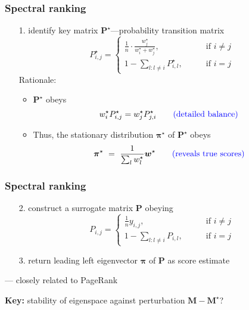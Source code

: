 \documentclass[compress,
mathserif,wide,%
]{beamer}
\begin{document}
\begin{frame}
	\frametitle{Spectral ranking}



	\begin{itemize}
		\item[{\color{black}1.}] identify key matrix  ${\bm{P}}^{\star}$---\alert{probability transition matrix}
		\[
			{P}^{\star}_{i,j}=\begin{cases}
			\frac{1}{n}\cdot\frac{w_j^{\star}}{w_i^{\star}+w_j^{\star}}, & \text{if }i\neq j\\
			1-\sum\nolimits _{l:l\neq i} {P}^{\star}_{i,l},\qquad & \text{if }i=j
			\end{cases}
		\]
		Rationale:
		\begin{itemize}
		\item  $\bm{P}^{\star}$ obeys
		\[
			w_i^{\star} P_{i,j}^{\star} = w_j^{\star} P_{j,i}^{\star} \qquad \textcolor{blue}{ \text{(detailed balance)}}
		\]
		\item Thus, the stationary distribution $\bm{\pi}^{\star}$ of $\bm{P}^{\star}$ obeys
		\[
			\bm{\pi}^{\star}  ~=~ \frac{1}{\sum_{l}w_l^{\star}} \bm{w}^{\star} \qquad \textcolor{blue}{ (\text{reveals true scores})}
		\]


	\end{itemize}

	\end{itemize}



\end{frame}



\begin{frame}
	\frametitle{Spectral ranking}
	\begin{itemize}
		
		\item[{\color{black}2.}] construct a surrogate matrix ${\bm{P}}$ obeying
		\[
			{P}_{i,j}=\begin{cases}
			\frac{1}{n}y_{i,j}, & \text{if }i\neq j\\
			1-\sum\nolimits _{l:l\neq i} {P}_{i,l},\qquad & \text{if }i=j
			\end{cases}
		\]
		\bigskip

		\item[{\color{black}3.}] return leading left eigenvector ${\bm{\pi}}$ of ${\bm{P}}$ as score estimate
	
	\end{itemize}


	\vfill

	\hfill --- closely related to PageRank

\pause
\vfill	
{

\begin{varblock}[\textwidth]{}
\begin{center}
	{\bf Key:} stability of eigenspace against perturbation $\bm{M}-\bm{M}^{\star}$? 
\end{center}
\end{varblock}
}
\end{frame}
\end{document}
